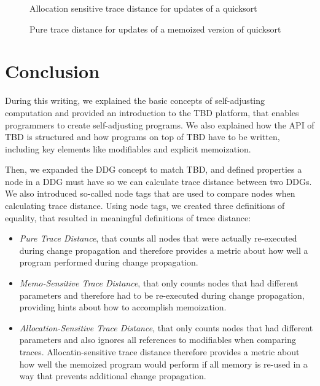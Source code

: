 \begin{figure}
  \centering
  \caption[margin=5]{Allocation sensitive trace distance for updates of a quicksort}
  \label{plot:quicksort_alloc}
\end{figure}

\begin{figure}
  \centering
  \caption[margin=5]{Pure trace distance for updates of a memoized version of quicksort}
  \label{plot:memo_quicksort_pure}
\end{figure}

\chapter{Conclusion}

During this writing, we explained the basic concepts of self-adjusting computation and provided an introduction to the TBD platform, that enables programmers to create self-adjusting programs. We also explained how the API of TBD is structured and how programs on top of TBD have to be written, including key elements like modifiables and explicit memoization. 

Then, we expanded the DDG concept to match TBD, and defined properties a node in a DDG must have so we can calculate trace distance between two DDGs. We also introduced so-called node tags that are used to compare nodes when calculating trace distance. Using node tags, we created three definitions of equality, that resulted in meaningful definitions of trace distance: 

\begin{itemize}
\item \textit{Pure Trace Distance}, that counts all nodes that were actually re-executed during change propagation and therefore provides a metric about how well a program performed during change propagation. 
\item \textit{Memo-Sensitive Trace Distance}, that only counts nodes that had different parameters and therefore had to be re-executed during change propagation, providing hints about how to accomplish memoization. 
\item \textit{Allocation-Sensitive Trace Distance}, that only counts nodes that had different parameters and also ignores all references to modifiables when comparing traces. Allocatin-sensitive trace distance therefore provides a metric about how well the memoized program would perform if all memory is re-used in a way that prevents additional change propagation. 
\end{itemize} 

